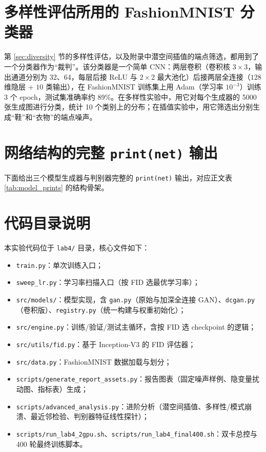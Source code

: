 \documentclass[a4paper]{article}
\begin{document}
\section{多样性评估所用的 FashionMNIST 分类器}
\label{app:clf}
第 \ref{sec:diversity} 节的多样性评估，以及附录中潜空间插值的端点筛选，都用到了一个分类器作为“裁判”。该分类器是一个简单 CNN：两层卷积（卷积核 $3\times3$，输出通道分别为 32、64，每层后接 ReLU 与 $2\times2$ 最大池化）后接两层全连接（$128$ 维隐层 + $10$ 类输出），在 FashionMNIST 训练集上用 Adam（学习率 $10^{-3}$）训练 3 个 epoch，测试集准确率约 89\%。在多样性实验中，用它对每个生成器的 5000 张生成图进行分类，统计 10 个类别上的分布；在插值实验中，用它筛选出分别生成“鞋”和“衣物”的端点噪声。

\section{网络结构的完整 \texttt{print(net)} 输出}
\label{app:prints}
下面给出三个模型生成器与判别器完整的 \texttt{print(net)} 输出，对应正文表 \ref{tab:model_prints} 的结构骨架。





\section{代码目录说明}
本实验代码位于 \texttt{lab4/} 目录，核心文件如下：
\begin{itemize}
    \item \texttt{train.py}：单次训练入口；
    \item \texttt{sweep\_lr.py}：学习率扫描入口（按 FID 选最优学习率）；
    \item \texttt{src/models/}：模型实现，含 \texttt{gan.py}（原始与加深全连接 GAN）、\texttt{dcgan.py}（卷积版）、\texttt{registry.py}（统一构建与权重初始化）；
    \item \texttt{src/engine.py}：训练/验证/测试主循环，含按 FID 选 checkpoint 的逻辑；
    \item \texttt{src/utils/fid.py}：基于 Inception-V3 的 FID 评估器；
    \item \texttt{src/data.py}：FashionMNIST 数据加载与划分；
    \item \texttt{scripts/generate\_report\_assets.py}：报告图表（固定噪声样例、隐变量扰动图、指标表）生成；
    \item \texttt{scripts/advanced\_analysis.py}：进阶分析（潜空间插值、多样性/模式崩溃、最近邻检验、判别器特征线性探针）；
    \item \texttt{scripts/run\_lab4\_2gpu.sh}、\texttt{scripts/run\_lab4\_final400.sh}：双卡总控与 400 轮最终训练脚本。
\end{itemize}



\end{document}
